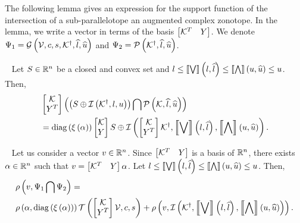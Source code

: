 The following lemma gives an expression for the support function of
the intersection of a sub-parallelotope an augmented complex zonotope.
In the lemma, we write a vector in terms of the basis
$\mymatrix{\transpose{\qtemp} & Y}$.  We denote
$\Psi_1=\acztope{\ptemp}{\cen}{\sfact}{\pinv{\qtemp}}{\plb}{\pub}$ and
$\Psi_2=\ptope{\pinv{\qtemp}}{\plb}{\pub}$.
%
\begin{lemma}~\label{lem:supp-intersection}
Let $S\in\reals^n$ be a closed and convex set and
$\lb\leq\maxapprox{\lb}{\plb}\leq\minapprox{\ub}{\pub}\leq\ub$. Then,
%
\begin{align*}
& \mymatrix{\qtemp\\ Y^T}\lt(\lt(S\oplus \iztope{\pinv{\qtemp}}{\lb}{\ub}\rt)\bigcap\ptope{\qtemp}{\plb}{\pub}\rt)\\
&= \diagonal{\ind{\alpha}}\mymatrix{\qtemp\\ Y}S
 \oplus\iztope{\mymatrix{\qtemp\\ Y^T}\pinv{\qtemp}}{\maxapprox{\lb}{\plb}}{\minapprox{\ub}{\pub}}.
\end{align*}
%
\end{lemma}
%
\begin{lemma}~\label{lem:supp-intersection}
Let us consider a vector $v\in\reals^n$. Since $\mymatrix{\qtemp^T &
Y}$ is a basis of $\reals^n$, there exists $\alpha\in\reals^n$ such
that $v=\mymatrix{\qtemp^T & Y}\alpha$.  Let
$\lb\leq\maxapprox{\lb}{\plb}\leq\minapprox{\ub}{\pub}\leq\ub$. Then,
%
\begin{align*}
& \supp{v}{\Psi_1\bigcap\Psi_2}=\\
& \supp{\alpha}{\diagonal{\ind{\alpha}}}{\tcztope{\mymatrix{\qtemp\\
Y^T}\ptemp}{\cen}{\sfact}}
 +\supp{v}{\iztope{\pinv{\qtemp}}{\maxapprox{\lb}{\plb}}{\minapprox{\ub}{\pub}}}.
\end{align*}
%
\end{lemma}
%
